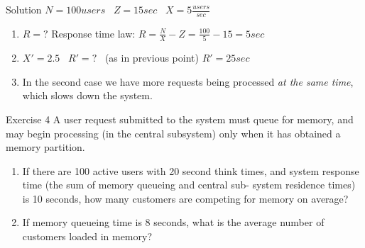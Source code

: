 \documentclass[]{beamer}
\begin{document}
\begin{frame}{Solution}
$N=100 users$ \ $Z=15 sec$ \ $X = 5 \frac{users}{sec}$

\begin{enumerate}
	\item $R=?$ Response time law: $R=\frac{N}{X}-Z = \frac{100}{5}-15 = 5 sec$
	\item $X'=2.5$ \ $R'=?$ \ (as in previous point) $R'=25 sec$
	\item In the second case we have more requests being processed \emph{at the same time}, which slows down the system.
\end{enumerate}
\end{frame}

\begin{frame}{Exercise 4 \cite{lazowska1984quantitative}}
A user request submitted to the system must queue for memory, and may begin processing (in the central subsystem) only when it has obtained a
memory partition.

\begin{enumerate}
	\item If there are 100 active users with 20 second think times, and system response time (the sum of memory queueing and central sub-
	system residence times) is 10 seconds, how many customers are
	competing for memory on average?
	\item If memory queueing time is 8 seconds, what is the average number of customers loaded in memory?	
\end{enumerate}
\end{frame}
\end{document}

